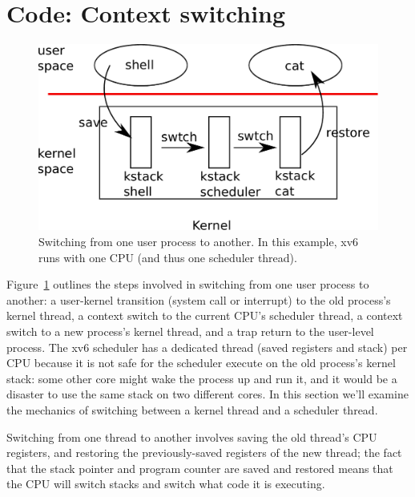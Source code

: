 \section{Code: Context switching}

\begin{figure}[t]
\center
\includegraphics[scale=0.5]{fig/switch.pdf}
\caption{Switching from one user process to another.  In this example, xv6 runs with one CPU (and thus one scheduler thread).}
\label{fig:switch}
\end{figure}

Figure~\ref{fig:switch} 
outlines the steps involved in switching from one
user process to another:
a user-kernel transition (system
call or interrupt) to the old process's kernel thread,
a context switch to the current CPU's scheduler thread, a context
switch to a new process's kernel thread, and a trap return
to the user-level process.
The xv6 scheduler has a dedicated thread (saved registers and stack)
per CPU because
it is not safe for the scheduler execute on
the old process's kernel stack: some other core might
wake the process up and run it, and it would be a disaster
to use the same stack on two different cores.
%
%
%
In this section we'll examine the mechanics of switching
between a kernel thread and a scheduler thread.

Switching from one thread to another involves saving the old thread's
CPU registers, and restoring the previously-saved registers of the
new thread; the fact that
the stack pointer and program counter
are saved and restored means that the CPU will switch stacks and
switch what code it is executing.


